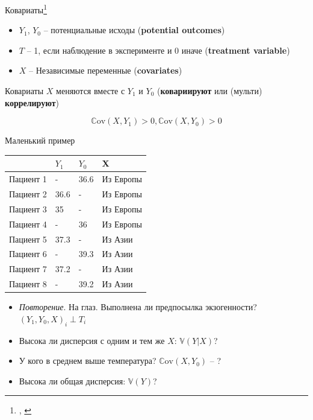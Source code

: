 \begin{frame}{Ковариаты\footnote{\cite[Раздел 3.1.1]{angrist2008mostly}, \cite[Глава 7.5-7.8]{imbens2015causal}}}
    \begin{itemize}
    \item $Y_1$, $Y_0$ -- потенциальные исходы (\textbf{potential outcomes})
    \item $T$ -- 1, если наблюдение в эксперименте и 0 иначе (\textbf{treatment variable})
    \item $X$ -- Независимые переменные (\textbf{covariates})
\end{itemize}
\pause
Ковариаты $X$ меняются  вместе с $Y_1$ и $Y_0$ (\textbf{ковариируют} или (мульти) \textbf{коррелируют})

$$\mathbb{C}\text{ov}(X, Y_1) > 0, \mathbb{C}\text{ov}(X, Y_0) > 0$$

\end{frame}

\begin{frame}{Маленький пример}
\begin{table}[]
\begin{tabular}{l|l|l||l}
&$Y_1$ & $Y_0$ & X \\
\hline
Пациент 1 & - & 36.6 & Из Европы \\
Пациент 2 & 36.6   & - & Из Европы \\
Пациент 3 & 35 & -  &  Из Европы \\
Пациент 4 & - & 36 &  Из Европы \\
Пациент 5 & 37.3   & - &  Из Азии \\
Пациент 6 & - & 39.3 &  Из Азии \\
Пациент 7 & 37.2   & - &  Из Азии \\
Пациент 8 & - & 39.2 &  Из Азии
\end{tabular}
\end{table}
\begin{itemize}[<+->]
    \item \textit{Повторение}. На глаз. Выполнена ли предпосылка экзогенности? $(Y_1, Y_0, X)_i \perp T_i$
    \item Высока ли дисперсия с одним и тем же $X$: $\mathbb{V}(Y|X)$? 
    \item У кого в среднем выше температура? $\mathbb{C}\text{ov}(X, Y_0)$ -- ?
    \item Высока ли общая дисперсия: $\mathbb{V}(Y)$? 
\end{itemize}

\end{frame}

